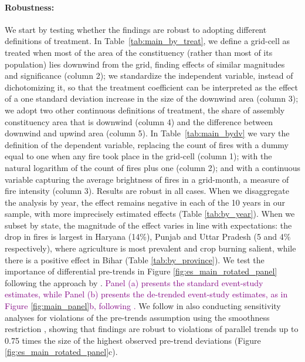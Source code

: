 \documentclass[12pt]{article}
\begin{document}
 \paragraph{Robustness:} We start by testing whether the findings are robust to adopting different definitions of treatment. In Table~\ref{tab:main_by_treat}, we define a grid-cell as treated when most of the area of the constituency (rather than most of its population) lies downwind from the grid, finding effects of similar magnitudes and significance (column 2); we standardize the independent variable, instead of dichotomizing it, so that the treatment coefficient can be interpreted as the effect of a one standard deviation increase in the size of the downwind area (column 3); we adopt two other continuous definitions of treatment, the share of assembly constituency area that is downwind (column 4) and the difference between downwind and upwind area (column 5). In Table~\ref{tab:main_bydv} we vary the definition of the dependent variable, replacing the count of fires with a dummy equal to one when any fire took place in the grid-cell (column 1); with the natural logarithm of the count of fires plus one (column 2); and with a continuous variable capturing the average brightness of fires in a grid-month, a measure of fire intensity (column 3). Results are robust in all cases. When we disaggregate the analysis by year, the effect remains negative in each of the 10 years in our sample, with more imprecisely estimated effects (Table \ref{tab:by_year}). When we subset by state, the magnitude of the effect varies in line with expectations: the drop in fires is largest in Haryana (14\%), Punjab and Uttar Pradesh  (5 and 4\% respectively), where agriculture is most prevalent and crop burning salient, while there is  a positive effect in Bihar (Table \ref{tab:by_province}).
 We test the importance of differential pre-trends in Figure \ref{fig:es_main_rotated_panel} following the approach by \citet{dustmann2022reallocation}. \textcolor{purple}{ Panel (a) presents the standard  event-study estimates, while Panel (b) presents the de-trended event-study estimates, as in Figure \ref{fig:main_panel}b, following \citet{dustmann2022reallocation}. } We follow \citet{dustmann2022reallocation} in also conducting sensitivity analyses for violations of the pre-trends assumption using the smoothness restriction \citep{rambachan2023more}, showing that findings are robust to violations of parallel trends up to 0.75 times the size of the highest observed pre-trend deviations (Figure \ref{fig:es_main_rotated_panel}c).
\end{document}
